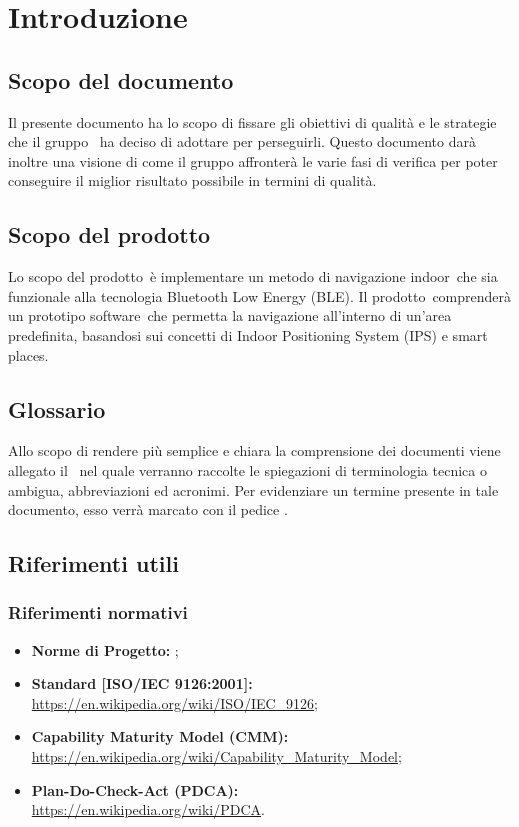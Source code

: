 \documentclass[../PianoDiQualifica.tex]{subfiles}
\begin{document}
\section{Introduzione}
	\subsection{Scopo del documento}
	Il presente documento ha lo scopo di fissare gli obiettivi di qualità e le strategie che il gruppo \leaf\ ha deciso di adottare per perseguirli. Questo documento darà inoltre una visione di come il gruppo affronterà le varie fasi di verifica per poter conseguire il miglior risultato possibile in termini di qualità.
	\subsection{Scopo del prodotto}
	Lo scopo del prodotto\g\ è implementare un metodo di navigazione indoor\g\ che sia funzionale alla tecnologia Bluetooth Low Energy (BLE\g). Il prodotto\g\ 
comprenderà un prototipo software\g\ che permetta la navigazione all’interno di un’area predefinita, basandosi sui concetti di Indoor Positioning System (IPS\g) e smart places\g.

	\subsection{Glossario}
	Allo scopo di rendere più semplice e chiara la comprensione dei documenti viene allegato il \glossariov\ nel quale verranno raccolte le spiegazioni di  terminologia tecnica o ambigua,
abbreviazioni ed acronimi. Per evidenziare un termine presente in tale documento, esso verrà marcato con il pedice \g.
	\subsection{Riferimenti utili}
		\subsubsection{Riferimenti normativi}
		\begin{itemize}
			\item \textbf{Norme di Progetto:} \normediprogettov;
			\item \textbf{Standard [ISO/IEC 9126:2001]:} \\\url{https://en.wikipedia.org/wiki/ISO/IEC\_9126};
			\item \textbf{Capability Maturity Model (CMM\g):} \\\url{https://en.wikipedia.org/wiki/Capability\_Maturity\_Model};
			\item \textbf{Plan-Do-Check-Act (PDCA\g):} \\\url{https://en.wikipedia.org/wiki/PDCA}.
		\end{itemize}
\end{document}
